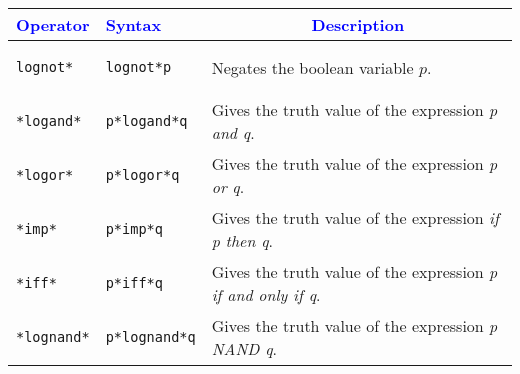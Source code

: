 \documentclass{article}
\begin{document}
\begin{center}
\begin{longtable}{llm{9cm}}
\toprule
\multicolumn{1}{c}{\textcolor{blue}{Operator}} & \multicolumn{1}{l}{\textcolor{blue}{Syntax}} & \multicolumn{1}{c}{\textcolor{blue}{Description}}  \\
\toprule
\begin{lstlisting}[caption={[]}]
lognot*
\end{lstlisting} &
\begin{lstlisting}[caption={[]}]
lognot*p
\end{lstlisting} & Negates the boolean variable \(p\).\\
\midrule
\begin{lstlisting}[caption={[]}]
*logand*
\end{lstlisting} &
\begin{lstlisting}[caption={[]}]
p*logand*q
\end{lstlisting} & Gives the truth value of the expression \emph{p and q}.\\
\midrule
\begin{lstlisting}[caption={[]}]
*logor*
\end{lstlisting} &
\begin{lstlisting}[caption={[]}]
p*logor*q
\end{lstlisting} & Gives the truth value of the expression \emph{p or q}.\\
\midrule
\begin{lstlisting}[caption={[]}]
*imp*
\end{lstlisting} &
\begin{lstlisting}[caption={[]}]
p*imp*q
\end{lstlisting} & Gives the truth value of the expression \emph{if p then q}.\\
\midrule
\begin{lstlisting}[caption={[]}]
*iff*
\end{lstlisting} &
\begin{lstlisting}[caption={[]}]
p*iff*q
\end{lstlisting} & Gives the truth value of the expression \emph{p if and only if q}.\\
\midrule
\begin{lstlisting}[caption={[]}]
*lognand*
\end{lstlisting} &
\begin{lstlisting}[caption={[]}]
p*lognand*q
\end{lstlisting} & Gives the truth value of the expression \emph{ p NAND q}.\\

\end{longtable}
\end{center}
\end{document}
